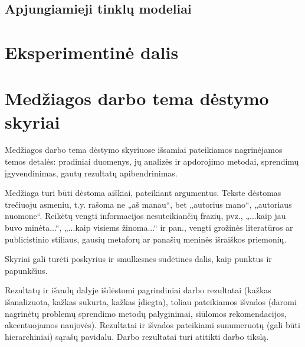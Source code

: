 \documentclass{VUMIFPSbakalaurinis}
\begin{document}
\subsection{Apjungiamieji tinklų modeliai}

\section{Eksperimentinė dalis}



\section{Medžiagos darbo tema dėstymo skyriai}
Medžiagos darbo tema dėstymo skyriuose išsamiai pateikiamos nagrinėjamos temos
detalės: pradiniai duomenys, jų analizės ir apdorojimo metodai, sprendimų
įgyvendinimas, gautų rezultatų apibendrinimas.

Medžiaga turi būti dėstoma aiškiai, pateikiant argumentus. Tekste dėstomas
trečiuoju asmeniu, t.y. rašoma ne „aš manau“, bet „autorius mano“, „autoriaus
nuomone“. Reikėtų vengti informacijos nesuteikiančių frazių, pvz., „...kaip jau
buvo minėta...“, „...kaip visiems žinoma...“ ir pan., vengti grožinės
literatūros ar publicistinio stiliaus, gausių metaforų ar panašių meninės
išraiškos priemonių.

Skyriai gali turėti poskyrius ir smulkesnes sudėtines dalis, kaip punktus ir
papunkčius.


Rezultatų ir išvadų dalyje išdėstomi pagrindiniai darbo rezultatai (kažkas
išanalizuota, kažkas sukurta, kažkas įdiegta), toliau pateikiamos išvados
(daromi nagrinėtų problemų sprendimo metodų palyginimai, siūlomos
rekomendacijos, akcentuojamos naujovės). Rezultatai ir išvados pateikiami
sunumeruotų (gali būti hierarchiniai) sąrašų pavidalu. Darbo rezultatai turi
atitikti darbo tikslą.

\printbibliography[heading=bibintoc]  %
\end{document}
